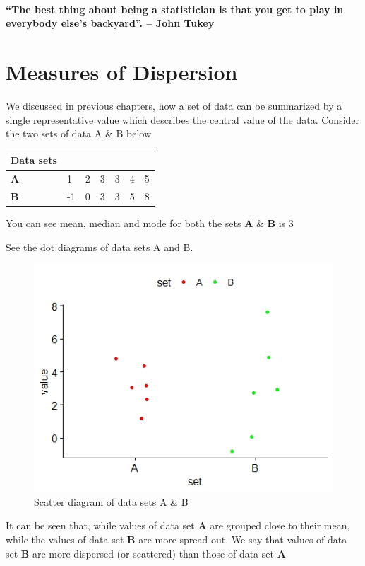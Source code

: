 \documentclass[
]{book}
\begin{document}
~\\
\strut ~\\
\strut ~

\label{hello}
\textbf{``The best thing about being a statistician is that you get to play in everybody else's backyard''. -- John Tukey}

\chapter{Measures of Dispersion}\label{measures-of-dispersion}

We discussed in previous chapters, how a set of data can be summarized
by a single representative value which describes the central value of
the data. Consider the two sets of data A \& B below\\

\begin{longtable}[]{@{}lllllll@{}}
\toprule\noalign{}
Data sets & & & & & & \\
\midrule\noalign{}
\endhead
\bottomrule\noalign{}
\endlastfoot
\textbf{A} & 1 & 2 & 3 & 3 & 4 & 5 \\
\textbf{B} & -1 & 0 & 3 & 3 & 5 & 8 \\
\end{longtable}

You can see mean, median and mode for both the sets \textbf{A} \& \textbf{B} is 3

See the dot diagrams of data sets A and B.

\begin{figure}

{\centering \includegraphics[width=0.5\linewidth]{images/image2_d} 

}

\caption{Scatter diagram of data sets A & B}\label{fig:d}
\end{figure}

It can be seen that, while values of data set \textbf{A} are grouped close to
their mean, while the values of data set \textbf{B} are more spread out. We
say that values of data set \textbf{B} are more dispersed (or scattered) than
those of data set \textbf{A}
\end{document}
